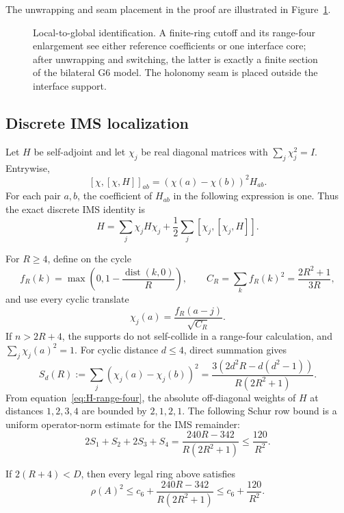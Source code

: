 The unwrapping and seam placement in the proof are illustrated in
Figure~\ref{fig:patch-localization}.
\begin{figure}[t]
\centering

\caption{Local-to-global identification.  A finite-ring cutoff and its
range-four enlargement see either reference coefficients or one interface
core; after unwrapping and switching, the latter is exactly a finite section
of the bilateral G6 model.  The holonomy seam is placed outside the interface
support.}
\label{fig:patch-localization}
\end{figure}

\subsection{Discrete IMS localization}
\label{subsec:discrete-ims-localization}

Let \(H\) be self-adjoint and let \(\chi_j\) be real diagonal matrices with
\(\sum_j\chi_j^2=I\).  Entrywise,
\[
[\chi,[\chi,H]]_{ab}=(\chi(a)-\chi(b))^2H_{ab}.
\]
For each pair \(a,b\), the coefficient of \(H_{ab}\) in the following
expression is one.  Thus the exact discrete IMS identity is
\begin{equation}\label{eq:ims-identity}
H=\sum_j\chi_jH\chi_j
+\frac12\sum_j[\chi_j,[\chi_j,H]].
\end{equation}

For \(R\geq4\), define on the cycle
\[
f_R(k)=\max\left(0,1-\frac{\operatorname{dist}(k,0)}R\right),
\qquad
C_R=\sum_kf_R(k)^2=\frac{2R^2+1}{3R},
\]
and use every cyclic translate
\[
\chi_j(a)=\frac{f_R(a-j)}{\sqrt{C_R}}.
\]
If \(n>2R+4\), the supports do not self-collide in a range-four
calculation, and \(\sum_j\chi_j(a)^2=1\).  For cyclic distance \(d\leq4\),
direct summation gives
\[
S_d(R):=\sum_j(\chi_j(a)-\chi_j(b))^2
=\frac{3(2d^2R-d(d^2-1))}{R(2R^2+1)}.
\]
From equation~\eqref{eq:H-range-four}, the absolute off-diagonal weights of
\(H\) at distances \(1,2,3,4\) are bounded by \(2,1,2,1\).  The following
Schur row bound is a uniform operator-norm estimate for the IMS remainder:
\begin{equation}\label{eq:ims-error}
2S_1+S_2+2S_3+S_4
=\frac{240R-342}{R(2R^2+1)}
\leq\frac{120}{R^2}.
\end{equation}

\begin{proposition}\label{prop:ims-cap}
If \(2(R+4)<D\), then every legal ring above satisfies
\[
\rho(A)^2
\leq c_6+\frac{240R-342}{R(2R^2+1)}
\leq c_6+\frac{120}{R^2}.
\]
\end{proposition}

